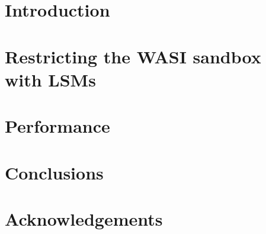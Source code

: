 \documentclass[a4paper,12pt,twoside,openright]{report}
\begin{document}
  
  \emptypage
  
  \emptypage
  \toc

  \clearpage
  
  \chapter{Introduction}
  

  \chapter{Restricting the WASI sandbox with LSMs}
  

  \chapter{Performance}
  

  \chapter{Conclusions}
  

  \nocite{*}
  \printbibliography[heading=bibintoc]

  \chapter*{Acknowledgements}
  
\end{document}
